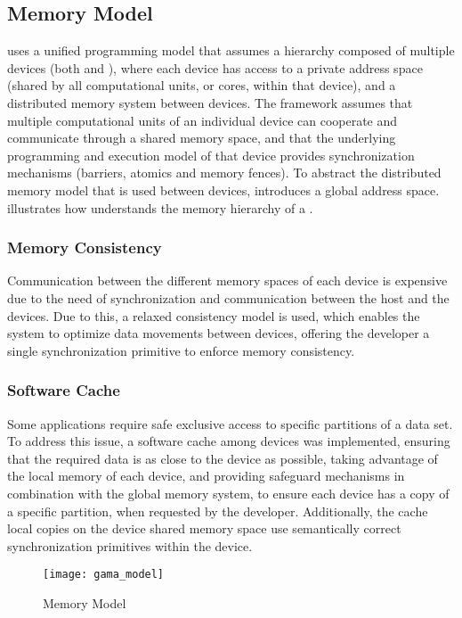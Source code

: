 \documentclass[main.tex]{subfiles}
\begin{document}
\subsection{Memory Model}

\gama uses a unified programming model that assumes a hierarchy composed of multiple devices (both \cpus and \gpus), where each device has access to a private address space (shared by all computational units, or cores, within that device), and a distributed memory system between devices. The framework assumes that multiple computational units of an individual device can cooperate and communicate through a shared memory space, and that the underlying programming and execution model of that device provides synchronization mechanisms (barriers, atomics and memory fences).
To abstract the distributed memory model that is used between devices, \gama introduces a global address space.  illustrates how \gama understands the memory hierarchy of a \hetplat.


\subsubsection{Memory Consistency}

Communication between the different memory spaces of each device is expensive due to the need of synchronization and communication between the host \cpu and the devices. Due to this, a relaxed consistency model is used, which enables the system to optimize data movements between devices, offering the developer a single synchronization primitive to enforce memory consistency.

\subsubsection{Software Cache}

Some applications require safe exclusive access to specific partitions of a data set. To address this issue, a software cache among devices was implemented, ensuring that the required data is as close to the device as possible, taking advantage of the local memory of each device, and providing safeguard mechanisms in combination with the global memory system, to ensure each device has a copy of a specific partition, when requested by the developer. Additionally, the cache local copies on the device shared memory space use semantically correct synchronization primitives within the device.

\begin{figure}[!htp]
  \centering
  \texttt{[image: gama\_model]}
  \caption{\gama Memory Model \label{fig:gama_memory_model}}
\end{figure}
\end{document}
